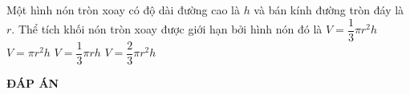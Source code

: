 \begin{ex}%
	Một hình nón tròn xoay có độ dài đường cao là $h$ và bán kính đường tròn đáy là  $r$. Thể tích khối nón tròn xoay được giới hạn bởi hình nón đó là
	\choice
	{\True $V=\dfrac{1}{3}\pi r^2 h$}
	{$V=\pi r^2 h$}
	{$V=\dfrac{1}{3}\pi r h$}
	{$V=\dfrac{2}{3}\pi r^2 h$}
\end{ex}






\newpage
\begin{center}
	\textbf{ĐÁP ÁN}
\end{center}
\begin{multicols}{10}
	
	
\end{multicols}



